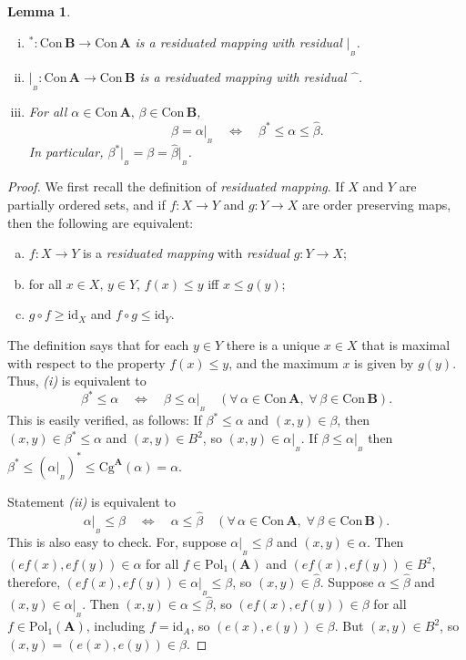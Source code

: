 \documentclass[cm,dissertation,actual,final]{uhthesis}
\theoremstyle{plain}
\newtheorem{lemma}[theorem]{Lemma}
\theoremstyle{definition}
\theoremstyle{remark}
\numberwithin{theorem}{section}
\numberwithin{claim}{chapter}
\numberwithin{equation}{section}
\numberwithin{conjecture}{chapter}
\newcommand{\<}{\ensuremath{\langle}}
\renewcommand{\>}{\ensuremath{\rangle}}
\renewcommand{\leq}{\ensuremath{\leqslant}}
\renewcommand{\geq}{\ensuremath{\geqslant}}
\newcommand{\Cg}{\ensuremath{\mathrm{Cg}}}
\newcommand{\Con}{\ensuremath{\mathrm{Con\,}}}
\newcommand{\Pol}{\ensuremath{\mathrm{Pol}}}
\newcommand{\0}{\ensuremath{\mathbf{0}}}
\newcommand{\1}{\ensuremath{\mathbf{1}}}
\newcommand{\2}{\ensuremath{\mathbf{2}}}
\newcommand{\3}{\ensuremath{\mathbf{3}}}
\newcommand{\4}{\ensuremath{\mathbf{4}}}
\newcommand{\5}{\ensuremath{\mathbf{5}}}
\newcommand{\bA}{\ensuremath{\mathbf{A}}}
\newcommand{\bB}{\ensuremath{\mathbf{B}}}
\newcommand{\id}{\ensuremath{\mathrm{id}}}
\newcommand{\resB}{\ensuremath{|_{_B}}}
\newcommand{\hatmap}{\ensuremath{\widehat{\phantom{x}}}}
\begin{document}
\begin{lemma}
\label{lem:residuation-lemma}
  ~
  \begin{enumerate}[(i)]
  \item $^*: \Con\bB \rightarrow \Con\bA$ is a residuated mapping with
    residual $\resB$.
  \item $\resB : \Con\bA \rightarrow \Con\bB$ is a residuated mapping with
    residual $\hatmap$.
  \item For all $\alpha \in \Con\bA, \, \beta \in \Con\bB$,
    \[
    \beta = \alpha\resB \quad \Leftrightarrow  \quad 
    \beta^* \leq \alpha \leq \widehat{\beta}.
    \]
    In particular, 
    $\beta^*\resB = \beta = \widehat{\beta}\resB$.
  \end{enumerate}
\end{lemma}
\begin{proof}
  We first recall the definition of {\it residuated mapping}.  If $X$ and $Y$
  are partially ordered sets, and if 
  $f: X \rightarrow Y$ and 
  $g: Y \rightarrow X$ are order preserving maps, then the following are
  equivalent:
  \begin{enumerate}[(a)]
  \item $f: X \rightarrow Y$ is a {\it residuated mapping} with {\it residual}
    $g: Y \rightarrow X$;
  \item for all $x\in X,\, y\in Y$,  $f(x) \leq y$ iff $x \leq g(y)$;
  \item $g\circ f \geq \id_X$ and $f\circ g \leq \id_Y$.
  \end{enumerate}
  The definition says that for each $y\in Y$ there is a unique
  $x\in X$ that is maximal with respect to the property $f(x) \leq y$, and the
  maximum $x$ is given by $g(y)$.
  Thus, {\it (i)} is equivalent to 
  \begin{equation}
    \label{eq:OAi}
    \beta^* \leq \alpha \quad \Leftrightarrow \quad \beta \leq \alpha\resB
    \quad (\forall \, \alpha \in \Con\bA,\; \forall \, \beta \in \Con\bB).
  \end{equation}
  This is easily verified, as follows:  If 
  $\beta^* \leq \alpha$ and $(x,y)\in \beta$, then
  $(x,y) \in \beta^* \leq \alpha$ 
  and $(x,y) \in B^2$, so $(x,y)\in
  \alpha\resB$.  If $\beta \leq \alpha\resB$ then 
  $\beta^* \leq (\alpha\resB)^* \leq \Cg^\bA(\alpha) = \alpha$.

  Statement {\it (ii)} is equivalent to 
  \begin{equation}
    \label{eq:OAii}
    \alpha\resB\leq \beta 
    \quad \Leftrightarrow \quad 
    \alpha \leq \widehat{\beta}
    \quad (\forall \, \alpha \in \Con\bA,\; \forall \, \beta \in \Con\bB).
  \end{equation}
  This is also easy to check.  For, suppose
  $\alpha\resB\leq \beta$ and $(x,y)\in \alpha$. Then $(ef(x), ef(y)) \in \alpha$
  for all $f \in \Pol_1(\bA)$ and $(ef(x), ef(y)) \in B^2$, therefore, 
  $(ef(x), ef(y)) \in \alpha\resB \leq \beta$, so $(x,y) \in \widehat{\beta}$.
  Suppose $\alpha \leq \widehat{\beta}$ and $(x,y) \in \alpha\resB$. 
  Then $(x,y) \in \alpha \leq  \widehat{\beta}$, so 
  $(ef(x), ef(y)) \in \beta$ for all $f\in \Pol_1(\bA)$, including $f=\id_A$, so 
  $(e(x), e(y)) \in \beta$. But $(x, y) \in B^2$, so $(x, y) = (e(x), e(y)) \in
  \beta$.


\end{proof}
\end{document}

